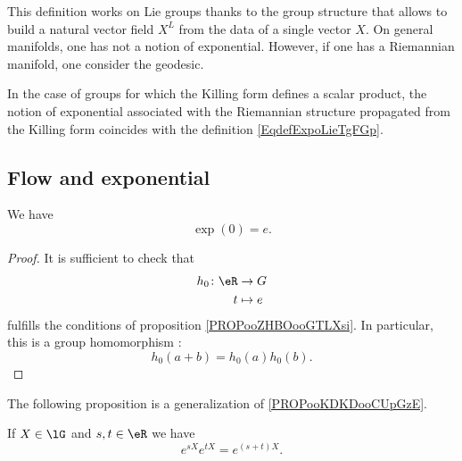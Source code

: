 \begin{normaltext}
    This definition works on Lie groups thanks to the group structure that allows to build a natural vector field \( X^L\) from the data of a single vector \( X\). On general manifolds, one has not a notion of exponential. However, if one has a Riemannian manifold, one consider the geodesic.

    In the case of groups for which the Killing form defines a scalar product, the notion of exponential associated with the Riemannian structure propagated from the Killing form coincides with the definition \eqref{EqdefExpoLieTgFGp}.
\end{normaltext}

\subsection{Flow and exponential}

\begin{lemma}
    We have
    \begin{equation}
        \exp(0)=e.
    \end{equation}
\end{lemma}

\begin{proof}
    It is sufficient to check that
    \begin{equation}
        \begin{aligned}
            h_0\colon \eR&\to G \\
            t&\mapsto e 
        \end{aligned}
    \end{equation}
    fulfills the conditions of proposition \ref{PROPooZHBOooGTLXsi}. In particular, this is a group homomorphism :
    \begin{equation}
        h_0(a+b)=h_0(a)h_0(b).
    \end{equation}
\end{proof}


The following proposition is a generalization of \ref{PROPooKDKDooCUpGzE}.
\begin{proposition}     \label{PROPooNRVJooEDCpOI}
    If \( X\in \lG\) and \( s,t\in \eR\) we have
    \begin{equation}
        e^{sX} e^{tX}= e^{(s+t)X}.
    \end{equation}
\end{proposition}

